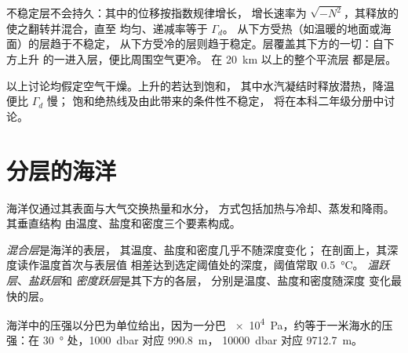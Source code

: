 不稳定层不会持久：其中的位移按指数规律增长，
增长速率为 $\sqrt{-N^2}$，其释放的使之翻转并混合，直至
均匀、递减率等于 $\Gamma_d$。
从下方受热（如温暖的地面或海面）的层趋于不稳定，
从下方受冷的层则趋于稳定。层覆盖其下方的一切：自下方上升
的一进入层，便比周围空气更冷。
在 \qty{20}{km} 以上的整个平流层
都是层。

以上讨论均假定空气干燥。上升的若达到饱和，
其中水汽凝结时释放潜热，降温便比 $\Gamma_d$ 慢；
饱和绝热线及由此带来的条件性不稳定，
将在本科二年级分册中讨论。

\section{分层的海洋}\label{sec:b1:fluid-envelopes-structure:ocean}

海洋仅通过其表面与大气交换热量和水分，
方式包括加热与冷却、蒸发和降雨。其垂直结构
由温度、盐度和密度三个要素构成。

\begin{definition}\label{def:b1:fluid-envelopes-structure:ocean-layers}
\emph{混合层}是海洋的表层，
其温度、盐度和密度几乎不随深度变化；
在剖面上，其深度读作温度首次与表层值
相差达到选定阈值处的深度，阈值常取 \qty{0.5}{\celsius}。
\emph{温跃层}、\emph{盐跃层}和
\emph{密度跃层}是其下方的各层，
分别是温度、盐度和密度随深度
变化最快的层。
\end{definition}

海洋中的压强以分巴为单位给出，因为一分巴
\qty{e4}{Pa}，约等于一米海水的压强：在
\qty{30}{\degree} 处，\qty{1000}{dbar} 对应 \qty{990.8}{m}，
\qty{10000}{dbar} 对应 \qty{9712.7}{m}。


